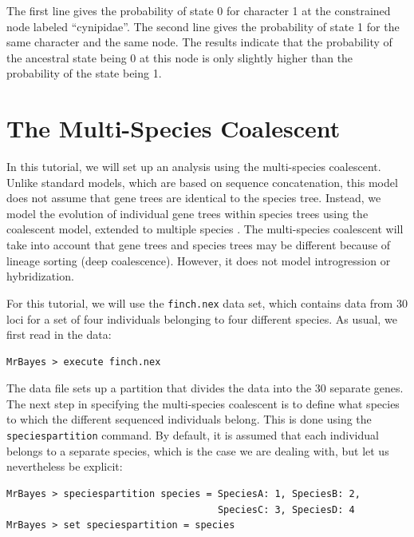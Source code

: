 \documentclass[12pt]{book}
\newcommand{\ttt}[1]{\texttt{#1} }
\begin{document}
The first line gives the probability of state 0 for character 1 at the constrained node labeled ``cynipidae''. The
second line gives the probability of state 1 for the same character and the same node. The results indicate
that the probability of the ancestral state being 0 at this node is only slightly higher than the probability of the
state being 1.

\section{The Multi-Species Coalescent}

In this tutorial, we will set up an analysis using the multi-species coalescent. Unlike standard models, which are
based on sequence concatenation, this model does not assume that
gene trees are identical to the species tree. Instead, we model the evolution of individual gene trees
within species trees using the coalescent model, extended to multiple species 
\citep{liu07,edwards07}. The multi-species coalescent will take into account that gene
trees and species trees may be different because of lineage sorting (deep coalescence). However, it
does not model introgression or hybridization.

For this tutorial, we will use the \ttt{finch.nex} data set, which contains data from 30 loci for a set of four
individuals belonging to four different species. As usual, we first read in the data:

\begin{verbatim}
MrBayes > execute finch.nex
\end{verbatim}

The data file sets up a partition that divides the data into the 30 separate genes. The next step in specifying
the multi-species coalescent is to define what species to which the different sequenced individuals belong. This
is done using the \ttt{speciespartition} command. By default, it is assumed that each individual belongs
to a separate species, which is the case we are dealing with, but let us nevertheless be explicit:

\begin{singlespacing}
\begin{verbatim}
MrBayes > speciespartition species = SpeciesA: 1, SpeciesB: 2,
                                     SpeciesC: 3, SpeciesD: 4
MrBayes > set speciespartition = species
\end{verbatim}
\end{singlespacing}
\end{document}
